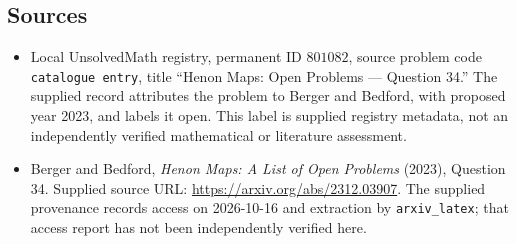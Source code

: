 \documentclass[11pt]{article}
\begin{document}
\subsection{Sources}
\begin{itemize}
\item Local UnsolvedMath registry, permanent ID \(801082\), source problem code \texttt{catalogue entry}, title ``Henon Maps: Open Problems --- Question 34.'' The supplied record attributes the problem to Berger and Bedford, with proposed year 2023, and labels it open. This label is supplied registry metadata, not an independently verified mathematical or literature assessment.
\item Berger and Bedford, \emph{Henon Maps: A List of Open Problems} (2023), Question 34. Supplied source URL: \url{https://arxiv.org/abs/2312.03907}. The supplied provenance records access on 2026-10-16 and extraction by \texttt{arxiv\_latex}; that access report has not been independently verified here.
\end{itemize}
\end{document}
